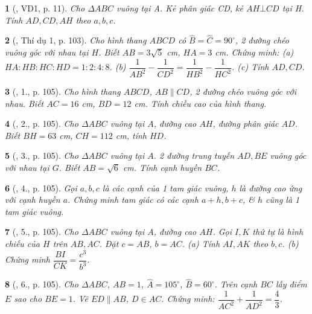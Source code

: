 \documentclass{article}
\newtheorem{baitoan}{}
\begin{document}
\begin{baitoan}[\cite{Son_Tinh_Trung_Nhuan_htl}, VD1, p. 11]
	Cho $\Delta ABC$ vuông tại A. Kẻ phân giác CD, kẻ $AH\bot CD$ tại H. Tính $AD,CD,AH$ theo $a,b,c$.
\end{baitoan}

\begin{baitoan}[\cite{Tuyen_Toan_9_old}, Thí dụ 1, p. 103]
	Cho hình thang $ABCD$ có $\widehat{B} = \widehat{C} = 90^\circ$, 2 đường chéo vuông góc với nhau tại $H$. Biết $AB = 3\sqrt{5}$ \emph{cm}, $HA = 3$ \emph{cm}. Chứng minh: (a) $HA:HB:HC:HD = 1:2:4:8$. (b) $\dfrac{1}{AB^2} - \dfrac{1}{CD^2} = \dfrac{1}{HB^2} - \dfrac{1}{HC^2}$. (c) Tính $AD,CD$.
\end{baitoan}

\begin{baitoan}[\cite{Tuyen_Toan_9_old}, 1., p. 105]
	Cho hình thang $ABCD$, $AB\parallel CD$, 2 đường chéo vuông góc với nhau. Biết $AC = 16$ \emph{cm}, $BD = 12$ \emph{cm}. Tính chiều cao của hình thang.
\end{baitoan}

\begin{baitoan}[\cite{Tuyen_Toan_9_old}, 2., p. 105]
	Cho $\Delta ABC$ vuông tại $A$, đường cao $AH$, đường phân giác $AD$. Biết $BH = 63$ \emph{cm}, $CH = 112$ \emph{cm}, tính $HD$.
\end{baitoan}

\begin{baitoan}[\cite{Tuyen_Toan_9_old}, 3., p. 105]
	Cho $\Delta ABC$ vuông tại $A$. 2 đường trung tuyến $AD,BE$ vuông góc với nhau tại $G$. Biết $AB = \sqrt{6}$ \emph{cm}. Tính cạnh huyền $BC$.
\end{baitoan}

\begin{baitoan}[\cite{Tuyen_Toan_9_old}, 4., p. 105]
	Gọi $a,b,c$ là các cạnh của 1 tam giác vuông, $h$ là đường cao ứng với cạnh huyền $a$. Chứng minh tam giác có các cạnh $a + h,b + c$, \& $h$ cũng là 1 tam giác vuông.
\end{baitoan}

\begin{baitoan}[\cite{Tuyen_Toan_9_old}, 5., p. 105]
	Cho $\Delta ABC$ vuông tại $A$, đường cao $AH$. Gọi $I,K$ thứ tự là hình chiếu của $H$ trên $AB,AC$. Đặt $c = AB$, $b = AC$. (a) Tính $AI,AK$ theo $b,c$. (b) Chứng minh $\dfrac{BI}{CK} = \dfrac{c^3}{b^3}$.
\end{baitoan}

\begin{baitoan}[\cite{Tuyen_Toan_9_old}, 6., p. 105]
	Cho $\Delta ABC$, $AB = 1$, $\widehat{A} = 105^\circ$, $\widehat{B} = 60^\circ$. Trên cạnh $BC$ lấy điểm $E$ sao cho $BE = 1$. Vẽ $ED\parallel AB$, $D\in AC$. Chứng minh: $\dfrac{1}{AC^2} + \dfrac{1}{AD^2} = \dfrac{4}{3}$.
\end{baitoan}
\end{document}
